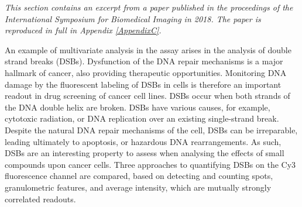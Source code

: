 \emph{This section contains an excerpt from a paper published in the proceedings of the International Symposium for Biomedical Imaging in 2018. The paper is reproduced in full in Appendix \ref{AppendixC}.}

An example of multivariate analysis in the assay arises in the analysis of double strand breaks (DSBs). Dysfunction of the DNA repair mechanisms is a major hallmark of cancer, also providing therapeutic opportunities. Monitoring DNA damage by the fluorescent labeling of DSBs in cells is therefore an important readout in drug screening of cancer cell lines. DSBs occur when both strands of the DNA double helix are broken. DSBs have various causes, for example, cytotoxic radiation, or DNA replication over an existing single-strand break. Despite the natural DNA repair mechanisms of the cell, DSBs can be irreparable, leading ultimately to apoptosis, or hazardous DNA rearrangements. As such, DSBs are an interesting property to assess when analysing the effects of small compounds upon cancer cells. Three approaches to quantifying DSBs on the Cy3 fluorescence channel are compared, based on detecting and counting spots, granulometric features, and average intensity, which are mutually strongly correlated readouts.

